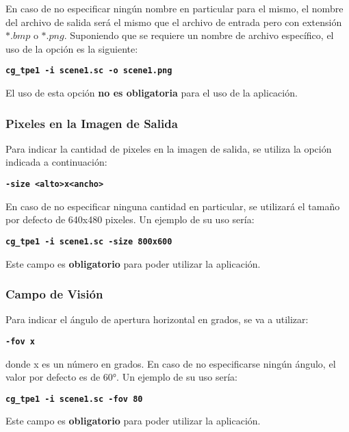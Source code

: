 \documentclass[a4paper,10pt]{article}
\begin{document}
En caso de no especificar ning\'un nombre en particular para el mismo, el nombre del archivo de salida ser\'a el mismo que el archivo de entrada pero con extensi\'on $*.bmp$ o $*.png$.  Suponiendo que se requiere un nombre de archivo espec\'ifico, el uso de la opci\'on es la siguiente:

 \begin{center}
 \textbf{\texttt{cg\_tpe1 -i scene1.sc -o scene1.png}}
\end{center}

El uso de esta opci\'on \textbf{no es obligatoria} para el uso de la aplicaci\'on.

\subsubsection{Pixeles en la Imagen de Salida}
Para indicar la cantidad de pixeles en la imagen de salida, se utiliza la opci\'on indicada a continuaci\'on:

\begin{center}
  \textbf{\texttt{-size <alto>x<ancho>}}
\end{center}

En caso de no especificar ninguna cantidad en particular, se utilizar\'a el tama\~no por defecto de 640x480 pixeles.  Un ejemplo de su uso ser\'ia:

 \begin{center}
 \textbf{\texttt{cg\_tpe1 -i scene1.sc -size 800x600}}
\end{center}

Este campo es \textbf{obligatorio} para poder utilizar la aplicaci\'on.

\subsubsection{Campo de Visi\'on}
Para indicar el \'angulo de apertura horizontal en grados, se va a utilizar:

\begin{center}
  \textbf{\texttt{-fov x}}
\end{center}

donde x es un n\'umero en grados.  En caso de no especificarse ning\'un \'angulo, el valor por defecto es de 60°.  Un ejemplo de su uso ser\'ia:

 \begin{center}
 \textbf{\texttt{cg\_tpe1 -i scene1.sc -fov 80}}
\end{center}

Este campo es \textbf{obligatorio} para poder utilizar la aplicaci\'on.
\end{document}
